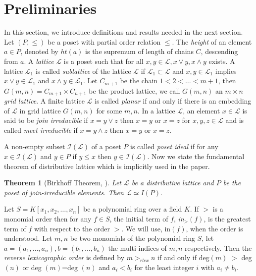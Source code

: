 \documentclass[10pt,reqno]{amsart}
\numberwithin{equation}{section}
\newtheorem{theorem}{Theorem}[section]
\begin{document}
\section{Preliminaries}\label{pre}
In this section, we introduce definitions and results needed in the next section. Let $(P,\leq)$ be a poset with partial order relation $\leq$. The \textit{height} of an element $a\in P$, denoted by $ht(a)$ is the supremum of length of chains $C$, descending from $a$. A \textit{lattice} $\mathcal{L}$ is a poset such that for all $x,y \in \mathcal{L}, x\vee y, x\wedge y$ exists. A lattice $\mathcal{L}_1$ is called \textit{sublattice} of the lattice $\mathcal{L}$ if $\mathcal{L}_1\subset \mathcal{L}$ and $x,y \in \mathcal{L}_1$ implies $x\vee y \in \mathcal{L}_1$ and $x\wedge y \in \mathcal{L}_1$. Let $C_{m+1}$ be the chain $1<2<\ldots <m+1$, then  $G(m,n)=C_{m+1}\times C_{n+1}$ be the product lattice, we call $G(m,n)$ an $m\times n$ \textit{grid lattice}. A finite lattice $\mathcal{L}$ is called \textit{planar} if and only if there is an embedding of $\mathcal{L}$ in grid lattice $G(m,n)$ for some $m,n$. In a lattice $\mathcal{L}$, an element $x \in \mathcal{L}$ is said to be \textit{join irreducible} if $x=y\vee z$ then $x=y$ or $x=z$ for $x,y,z \in \mathcal{L}$ and is called \textit{meet irreducible} if $x=y\wedge z$ then $x=y$ or $x=z$.

A non-empty subset $\mathcal{I}(\mathcal{L})$ of a poset $P$ is called \textit{poset ideal} if for any $x\in\mathcal{I}(\mathcal{L})$ and $y\in P$ if $y\leq x$ then $y \in \mathcal{I}(\mathcal{L})$. Now we state the fundamental theorem of distributive lattice which is implicitly used in the paper. \begin{theorem}[Birkhoff Theorem, \cite{gratzer_lattice}]Let $\mathcal{L}$ be a distributive lattice and $P$ be the poset of join-irreducible elements. Then $\mathcal{L}\simeq I(P)$.
\end{theorem}
Let $S=K[x_1,x_2,\ldots,x_n]$ be a polynomial ring over a field $K$. If $>$ is a monomial order then for any $f\in S$, the initial term of $f$, \textit{in$_>(f)$}, is the greatest term of $f$ with respect to the order $>$. We will use, in$(f)$, when the order is understood. Let $m,n$ be two monomials of the polynomial ring $S$, let $a=(a_1,\ldots,a_n), b=(b_1,\ldots,b_n)$ the multi indices of $m,n$ respectively. Then the \textit{reverse lexicographic order} is defined by $m>_{rlex} n$ if and only if deg$(m)$ $>$ deg$(n)$ or deg $(m)$=deg $(n)$ and $a_i<b_i$ for the least integer $i$ with $a_i\neq b_i$.
\end{document}
